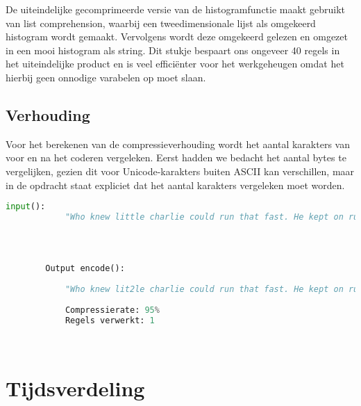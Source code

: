 \documentclass{article}
\begin{document}
      De uiteindelijke gecomprimeerde versie van de histogramfunctie maakt
			gebruikt van list comprehension, waarbij een tweedimensionale lijst
			als omgekeerd histogram wordt gemaakt. Vervolgens wordt deze omgekeerd
			gelezen en omgezet in een mooi histogram als string.
			Dit stukje bespaart ons ongeveer 40 regels in het uiteindelijke product
			en is veel effici\"enter voor het werkgeheugen omdat het hierbij geen
			onnodige varabelen op moet slaan. 
    

    
    \subsection{Verhouding}
		    Voor het berekenen van de compressieverhouding wordt het 
				aantal karakters van voor en na het coderen vergeleken.
				Eerst hadden we bedacht het aantal bytes te vergelijken, gezien
				dit voor Unicode-karakters buiten ASCII kan verschillen, maar in de
				opdracht staat expliciet dat het aantal karakters vergeleken moet
				worden.
        \newpage
        \begin{lstlisting}[frame=single, language=python]  % Start your code-block
        input():
            "Who knew little charlie could run that fast. He kept on running faster fasteer and fasteeeeeerr !"
            
            
        
        
        Output encode():    
            
            "Who knew lit2le charlie could run that fast. He kept on run2ing faster faste2r and faste6r2 !"
                
            Compressierate: 95%
            Regels verwerkt: 1

            
        \end{lstlisting}

\section{Tijdsverdeling}
\end{document}
